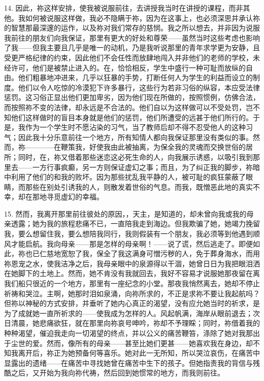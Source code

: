 14. 因此，祢这样安排，使我被说服前往，去讲授我当时在讲授的课程，而非其他。我如何被说服这样做，我必不隐瞒于祢，因为在这事上，也必须深思并承认祢的智慧那最深邃的运作，以及祢对我们常存的慈悯。我之所以想去，并非因为说服我前往的朋友们向我保证，那里有更大的好处和尊荣——虽然当时这些考虑也影响了我——但我主要且几乎是唯一的动机，乃是我听说那里的青年求学更为安静，且受更严格纪律的约束，因此他们不会任性而放肆地闯入并非他们的老师的学校，未经许可，他们是被禁止进入的。在，恰恰相反，学生中盛行一种可耻而放纵的自由。他们粗暴地冲进来，几乎以狂暴的手势，打断任何人为学生的利益而设立的制度。他们以令人吃惊的冷漠犯下许多暴行，这些行为若非习俗的纵容，本应受法律惩罚。这习俗正显出他们更加卑劣，因为他们现在所做的，按照惯例，仿佛合法，而按照祢不变的法律，却永远是不合法的。他们自以为这样做可以不受处罚，岂不知他们这样做时的盲目本身就是他们的惩罚，他们所遭受的远甚于他们所行的。于是，我作为一个学生时不愿沾染的习气，当了教师后却不得不忍受他人的这种习气；因此我十分乐意前往一个地方，所有知情人都向我保证那里没有类似的事。然而，祢————在鞭策我，好使我由此被抽离，为保全我的灵魂而交换世俗的居所；同时，在，祢又借着那些迷恋这必死生命的人，向我展示诱惑，以吸引我到那里去——一方行事疯癫，另一方则保证虚幻之事；而且，为了纠正我的脚步，祢暗中利用了他们的和我的败坏。因为那些扰乱我平静的人，被可耻的疯狂蒙蔽了眼睛，而那些在别处引诱我的人，则散发着世俗的气息。而我，既憎恶此地的真实不幸，却在那地寻觅虚幻的幸福。\par

15. 然而，我离开那里前往彼处的原因，，天主，是知道的，却未曾向我或我的母亲透露；她为我的旅程悲痛不已，一直陪我走到海边。但我欺骗了她，她竭力挽留我，要么想留住我，要么想陪我同行，我则假装有一个朋友，我必须等到他遇到顺风才能启航。我向母亲——那是怎样的母亲啊！——说了谎，然后逃走了。即便如此，祢也已仁慈地宽恕了我，保全了我这满身可憎污秽的人，免于葬身海水，而用祢恩宠之水，使我洁净之后，我母亲眼中的泉源得以干涸，她曾日日为我把眼泪洒在她脚下的土地上。然而，她不肯没有我就回去，我好不容易才说服她那夜留在离我们船只很近的一个地方，那里有一座纪念的小堂。那夜我悄然离去，她却不停止祈祷和哭泣。主啊，她那时泪如泉涌，向祢所求的，不正是求祢不要让我起航吗？但祢以神秘的方式安排，并垂听了她内心真正的渴望，没有应允她当时的祈求，是为了成就她一直所祈求的——使我成为怎样的人。风起帆满，海岸从眼前退去；次日清晨，她悲痛欲狂，就在那里向祢哀号呻吟，祢却不予理睬；同时，祢借着我的种种渴望，催迫我走向一切渴望的终点，并以公义的痛苦鞭笞，涤除了她对我那出于尘世的爱。然而，像所有的母亲——甚至比她们更甚——她喜欢我在身边，却不知我离开后，祢正为她预备何等喜乐。她对此一无所知，所以哭泣哀伤，在痛苦中显露出的遗绪——在痛苦中寻找她曾在痛苦中生下的孩子。但她指责我的背信与残酷之后，又开始为我向祢代祷，然后回到她惯常的地方，而我则前往。\par

